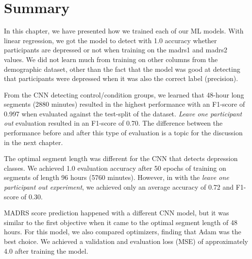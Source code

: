 \section{Summary}
In this chapter, we have presented how we trained each of our ML models. With linear regression, we got the model to detect with 1.0 accuracy whether participants are depressed or not when training on the madrs1 and madrs2 values. We did not learn much from training on other columns from the demographic dataset, other than the fact that the model was good at detecting that participants were depressed when it was also the correct label (precision).

From the CNN detecting control/condition groups, we learned that 48-hour long segments (2880 minutes) resulted in the highest performance with an F1-score of 0.997 when evaluated against the test-split of the dataset. \textit{Leave one participant out} evaluation resulted in an F1-score of 0.70. The difference between the performance before and after this type of evaluation is a topic for the discussion in the next chapter. 

The optimal segment length was different for the CNN that detects depression classes. We achieved 1.0 evaluation accuracy after 50 epochs of training on segments of length 96 hours (5760 minutes). However, in with the \textit{leave one participant out experiment}, we achieved only an average accuracy of 0.72 and F1-score of 0.30. 

MADRS score prediction happened with a different CNN model, but it was similar to the first objective when it came to the optimal segment length of 48 hours. For this model, we also compared optimizers, finding that Adam was the best choice. We achieved a validation and evaluation loss (MSE) of approximately 4.0 after training the model. 